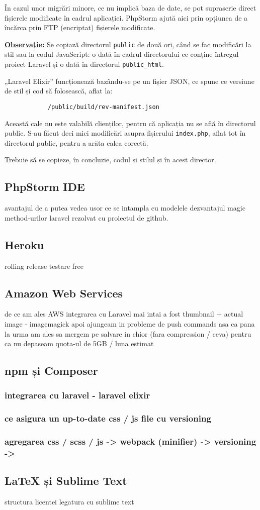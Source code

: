 		În cazul unor migrări minore, ce nu implică baza de date, se pot suprascrie direct fișierele modificate în cadrul aplicației.
		PhpStorm ajută aici prin opțiunea de a încărca prin FTP (encriptat) fișierele modificate.

		\textbf{\underline{Observație:}} Se copiază directorul \verb|public| de două ori, când se fac modificări la stil sau la codul JavaScript: o dată în cadrul directorului ce conține întregul proiect Laravel și o dată în directorul \verb|public_html|.

		„Laravel Elixir” funcționează bazându-se pe un fișier JSON, ce spune ce versiune de stil și cod să folosească, aflat la:
		\begin{verbatim}
			/public/build/rev-manifest.json
		\end{verbatim}

		Această cale nu este valabilă clienților, pentru că aplicația nu se află în directorul public.
		S-au făcut deci mici modificări asupra fișierului \verb|index.php|, aflat tot în directorul public, pentru a arăta calea corectă.

		Trebuie să se copieze, în concluzie, codul și stilul și în acest director.

	\subsection{PhpStorm IDE}
	\label{sec:phpstorm}
		avantajul de a putea vedea usor ce se intampla cu modelele
		dezvantajul magic method-urilor laravel rezolvat cu proiectul de github.
	\subsection{Heroku}
		rolling release
		testare
		free
	\subsection{Amazon Web Services}
		de ce am ales AWS
		integrarea cu Laravel
		mai intai a fost thumbnail + actual image - imagemagick
		apoi ajungeam in probleme de push commands
		asa ca pana la urma am ales sa mergem pe salvare in chior (fara compression / ceva)
			pentru ca nu depaseam quota-ul de 5GB / luna estimat
	\subsection{npm și Composer}
		\subsubsection{integrarea cu laravel - laravel elixir}
		\subsubsection{ce asigura un up-to-date css / js file cu versioning}
		\subsubsection{agregarea css / scss / js -> webpack (minifier) -> versioning ->}
	\subsection{LaTeX și Sublime Text}
		structura licentei
		legatura cu sublime text
